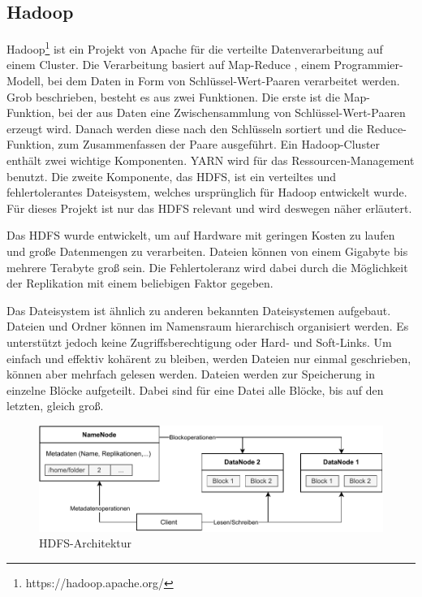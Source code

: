 \subsection{Hadoop}

Hadoop\footnote{https://hadoop.apache.org/} ist ein Projekt von Apache für die verteilte Datenverarbeitung auf einem Cluster.
Die Verarbeitung basiert auf  Map-Reduce \parencite{mapred}, einem Programmier-Modell, bei dem Daten in Form von Schlüssel-Wert-Paaren verarbeitet werden.
Grob beschrieben, besteht es aus zwei Funktionen.
Die erste ist die Map-Funktion, bei der aus Daten eine Zwischensammlung von Schlüssel-Wert-Paaren erzeugt wird.
Danach werden diese nach den Schlüsseln sortiert und die Reduce-Funktion, zum Zusammenfassen der Paare ausgeführt.
Ein Hadoop-Cluster enthält zwei wichtige Komponenten.
YARN \parencite{yarn} wird für das Ressourcen-Management benutzt.
Die zweite Komponente, das HDFS, ist ein verteiltes und fehlertolerantes Dateisystem, welches ursprünglich für Hadoop entwickelt wurde.
Für dieses Projekt ist nur das HDFS relevant und wird deswegen näher erläutert.

Das HDFS wurde entwickelt, um auf Hardware mit geringen Kosten zu laufen und große Datenmengen zu verarbeiten.
Dateien können von einem Gigabyte bis mehrere Terabyte groß sein.
Die Fehlertoleranz wird dabei durch die Möglichkeit der Replikation mit einem beliebigen Faktor gegeben.

Das Dateisystem ist ähnlich zu anderen bekannten Dateisystemen aufgebaut.
Dateien und Ordner können im Namensraum hierarchisch organisiert werden.
Es unterstützt jedoch keine Zugriffsberechtigung oder Hard- und Soft-Links.
Um einfach und effektiv kohärent zu bleiben, werden Dateien nur einmal geschrieben, können aber mehrfach gelesen werden.
Dateien werden zur Speicherung in einzelne Blöcke aufgeteilt.
Dabei sind für eine Datei alle Blöcke, bis auf den letzten, gleich groß.

\begin{figure}
    \centering
    \includegraphics[width=\textwidth]{Grafiken/Grundlagen/HDFS.pdf}
    \caption[HDFS-Architektur]{HDFS-Architektur\footnotemark}
    \label{fig:hdfs-cluster}
\end{figure}


